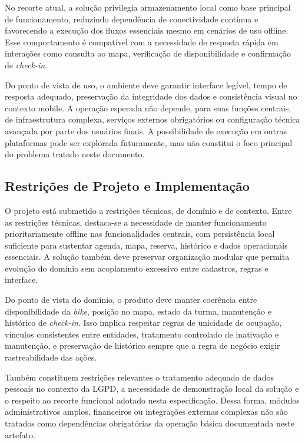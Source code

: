 No recorte atual, a solução privilegia armazenamento local como base principal de funcionamento, reduzindo dependência de conectividade contínua e favorecendo a execução dos fluxos essenciais mesmo em cenários de uso offline. Esse comportamento é compatível com a necessidade de resposta rápida em interações como consulta ao mapa, verificação de disponibilidade e confirmação de \textit{check-in}.

Do ponto de vista de uso, o ambiente deve garantir interface legível, tempo de resposta adequado, preservação da integridade dos dados e consistência visual no contexto mobile. A operação esperada não depende, para suas funções centrais, de infraestrutura complexa, serviços externos obrigatórios ou configuração técnica avançada por parte dos usuários finais. A possibilidade de execução em outras plataformas pode ser explorada futuramente, mas não constitui o foco principal do problema tratado neste documento.

\subsection{Restrições de Projeto e Implementação}
O projeto está submetido a restrições técnicas, de domínio e de contexto. Entre as restrições técnicas, destaca-se a necessidade de manter funcionamento prioritariamente offline nas funcionalidades centrais, com persistência local suficiente para sustentar agenda, mapa, reserva, histórico e dados operacionais essenciais. A solução também deve preservar organização modular que permita evolução do domínio sem acoplamento excessivo entre cadastros, regras e interface.

Do ponto de vista do domínio, o produto deve manter coerência entre disponibilidade da \textit{bike}, posição no mapa, estado da turma, manutenção e histórico de \textit{check-in}. Isso implica respeitar regras de unicidade de ocupação, vínculos consistentes entre entidades, tratamento controlado de inativação e manutenção, e preservação de histórico sempre que a regra de negócio exigir rastreabilidade das ações.

Também constituem restrições relevantes o tratamento adequado de dados pessoais no contexto da LGPD, a necessidade de demonstração local da solução e o respeito ao recorte funcional adotado nesta especificação. Dessa forma, módulos administrativos amplos, financeiros ou integrações externas complexas não são tratados como dependências obrigatórias da operação básica documentada neste artefato.

